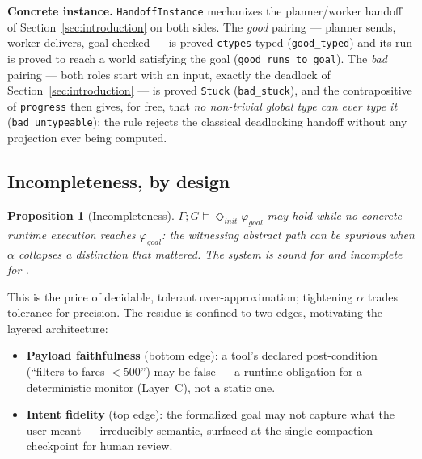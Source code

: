 \documentclass{article}
\theoremstyle{plain}
\newtheorem{proposition}{Proposition}
\theoremstyle{definition}
\newcommand{\gphi}{\varphi_{\mathit{goal}}}
\newcommand{\achinit}{\vDash\Diamond_{\mathit{init}}}
\newcommand{\id}[1]{\texttt{#1}}
\begin{document}
\noindent\textbf{Concrete instance.} \id{HandoffInstance} mechanizes the
planner/worker handoff of Section~\ref{sec:introduction} on both sides. The
\emph{good} pairing --- planner
sends, worker delivers, goal checked --- is proved \id{ctypes}-typed
(\id{good\_typed}) and its run is proved to reach a world satisfying the goal
(\id{good\_runs\_to\_goal}). The \emph{bad} pairing --- both roles start with an
input, exactly the deadlock of Section~\ref{sec:introduction} --- is proved
\id{Stuck} (\id{bad\_stuck}), and
the contrapositive of \id{progress} then gives, for free, that \emph{no
non-trivial global type can ever type it} (\id{bad\_untypeable}): the rule rejects
the classical deadlocking handoff without any projection ever being computed.

\subsection{Incompleteness, by design}
\begin{proposition}[Incompleteness]\label{prop:inc}
$\Gamma;G\achinit\gphi$ may hold while no concrete runtime execution reaches
$\gphi$: the
witnessing abstract path can be spurious when $\alpha$ collapses a distinction
that mattered. The system is \emph{sound for  and incomplete for
}.
\end{proposition}
This is the price of decidable, tolerant over-approximation; tightening $\alpha$
trades tolerance for precision. The residue is confined to two edges, motivating
the layered architecture:
\begin{itemize}\setlength{\itemsep}{1pt}
\item \textbf{Payload faithfulness} (bottom edge): a tool's declared
post-condition (``filters to fares $<500$'') may be false --- a runtime obligation
for a deterministic monitor (Layer~C), not a static one.
\item \textbf{Intent fidelity} (top edge): the formalized goal may not capture what
the user meant --- irreducibly semantic, surfaced at the single compaction
checkpoint for human review.
\end{itemize}
\end{document}
